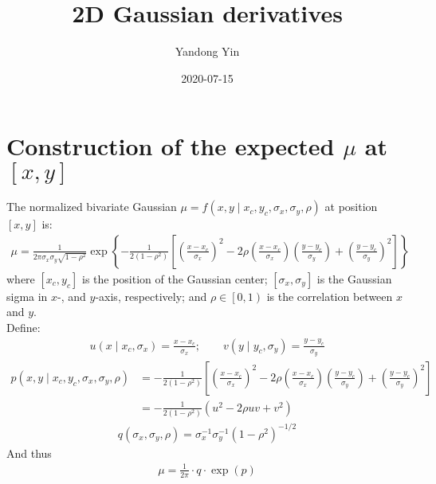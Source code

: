 \documentclass[11pt]{article} %
\title{\rmfamily\bfseries\upshape 2D Gaussian derivatives}
\author{Yandong Yin}
\date{2020-07-15} %
\begin{document}
\begin{titlepage}
\maketitle
\end{titlepage}

\section{Construction of the expected $\mu$ at $\left[x, y\right]$}
The normalized bivariate Gaussian $\mu = f\left(x, y \mid x_c, y_c, \sigma_x, \sigma_y, \rho\right) $ at position $\left[x, y\right]$ is:
\begin{align*}
\mu =  \frac{1}{2 \pi \sigma_x \sigma_y \sqrt{1-\rho^2}} \exp \left\{-\frac{1}{2\left(1-\rho^2\right)} \left[ \left(\frac{x - x_c}{\sigma_x}\right)^2 -2\rho\left(\frac{x-x_c}{\sigma_x}\right)\left(\frac{y-y_c}{\sigma_y}\right) + \left(\frac{y-y_c}{\sigma_y}\right)^2 \right]\right\}
\end{align*}
where $[x_c, y_c]$ is the position of the Gaussian center; $[\sigma_x, \sigma_y]$ is the Gaussian sigma in $x$-, and $y$-axis, respectively; and $\rho \in \left[0, 1 \right)$ is the correlation between $x$ and $y$.\\ 
Define:
\begin{align*}
u\left(x\mid x_c, \sigma_x\right) = \frac{x-x_c}{\sigma_x}; \qquad v\left(y\mid y_c, \sigma_y\right) = \frac{y-y_c}{\sigma_y}
\end{align*}
\begin{align*}
p\left(x, y\mid x_c, y_c, \sigma_x, \sigma_y, \rho\right) &= -\frac{1}{2\left(1-\rho^2\right)} \left[ \left(\frac{x - x_c}{\sigma_x}\right)^2 -2\rho\left(\frac{x-x_c}{\sigma_x}\right)\left(\frac{y-y_c}{\sigma_y}\right) + \left(\frac{y-y_c}{\sigma_y}\right)^2 \right] \\
&=-\frac{1}{2\left(1-\rho^2\right)} \left(u^2 -2\rho uv+v^2 \right)
\end{align*}
\begin{align*}
q\left(\sigma_x, \sigma_y, \rho\right) =\sigma_x^{-1}\sigma_y^{-1}\left(1-\rho^2\right)^{-1/2}
\end{align*}
And thus
\begin{align*}
\mu = \frac{1}{2\pi} \cdot q \cdot \exp\left(p\right)
\end{align*}
\end{document}
